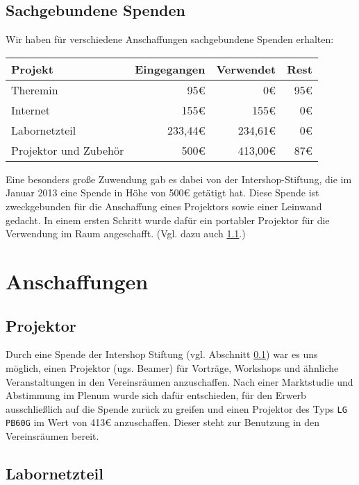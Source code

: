 \documentclass[10pt,DIV16]{scrartcl}
\begin{document}
\subsection{Sachgebundene Spenden}
\label{sec:sachegebundene_spenden}
Wir haben für verschiedene Anschaffungen sachgebundene Spenden erhalten:

\begin{table}[h]
	\begin{tabular}{l|r|r|r}
	\textbf{Projekt} & \textbf{Eingegangen} & \textbf{Verwendet} & \textbf{Rest} \\ \hline
	Theremin & 95\euro & 0\euro & 95\euro \\
	Internet & 155\euro & 155\euro & 0\euro \\
	Labornetzteil & 233,44\euro & 234,61\euro & 0\euro{} \\
	Projektor und Zubehör & 500\euro & 413,00\euro & 87\euro \\
	\end{tabular}
\end{table}

Eine besonders große Zuwendung gab es dabei von der 
Intershop-Stiftung, die im Januar 2013 eine Spende in Höhe von 
500\euro{} getätigt hat. Diese Spende ist zweckgebunden für die 
Anschaffung eines Projektors sowie einer Leinwand gedacht. In einem 
ersten Schritt wurde dafür ein portabler Projektor für die Verwendung 
im Raum angeschafft. (Vgl. dazu auch \ref{sec:beamerkauf}.)

\section{Anschaffungen}
\label{sec:anschaffungen}

\subsection{Projektor}
\label{sec:beamerkauf}

Durch eine Spende der Intershop Stiftung (vgl. Abschnitt
\ref{sec:sachegebundene_spenden}) war es uns möglich, einen Projektor (ugs.
Beamer) für Vorträge, Workshops und ähnliche Veranstaltungen in den
Vereinsräumen anzuschaffen. Nach einer Marktstudie und Abstimmung im Plenum
wurde sich dafür entschieden, für den Erwerb ausschließlich auf die Spende
zurück zu greifen und einen Projektor des Typs \texttt{LG PB60G} im Wert von
413\euro{} anzuschaffen.  Dieser steht zur Benutzung in den Vereinsräumen
bereit.

\subsection{Labornetzteil}
\label{sec:labornetzteil}
\end{document}
